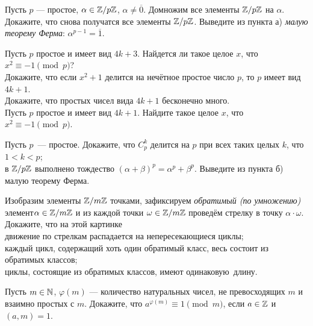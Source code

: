 \documentclass[a4paper, 12pt]{article}
\newcommand{\ov}{\overline}
\newcommand{\Zm}[1]{\Z/ {#1}\Z}
\begin{document}
Пусть $p$ --- простое, $\alpha\in\Zm{p}$, $\alpha\ne\ov{0}$.
Домножим все элементы $\Zm{p}$ на $\alpha$. Докажите, что снова получатся
все элементы $\Zm{p}$.
Выведите из пункта а) {\it малую теорему Ферма}: $\alpha^{p-1}=\ov{1}$.




Пусть $p$ простое и имеет вид $4k+3$. Найдется ли такое целое $x$, что $x^2\equiv-1\!\pmod{p}$?\\
Докажите, что если $x^2+1$ делится на неч\"етное простое число $p$,
то $p$ имеет вид $4k+1$.\\
Докажите, что простых чисел вида $4k+1$ бесконечно много.\\
Пусть $p$ простое и имеет вид $4k+1$. Найдите такое целое $x$, что $x^2\equiv-1\!\pmod{p}$.


 Пусть $p$~--- простое. Докажите, что
 $C_p^k$ делится на $p$ при всех таких целых $k$, что $1 < k < p$;\\
в $\Zm{p}$ выполнено тождество $(\alpha + \beta)^p = \alpha^p + \beta^p$.
 Выведите из пункта б) малую теорему Ферма.


Изобразим элементы $\Zm{m}$ точками, зафиксируем
{\it обратимый (по умножению)} элемент\break $\alpha\in\Zm{m}$ и из каждой точки
$\omega\in\Zm{m}$ провед\"ем стрелку в точку $\alpha\cdot \omega$.
Докажите, что на этой картинке \\
 движение по стрелкам распадается на непересекающиеся циклы;\\
 каждый цикл, содержащий хоть один обратимый класс, весь состоит из обратимых классов;\\
 циклы, состоящие из обратимых классов, имеют одинаковую~длину.



Пусть $m\in\mathbb{N}$,
$\varphi(m)$ --- количество натуральных чисел, не превосходящих $m$ и взаимно
простых с $m$.  Докажите, что $a^{\varphi(m)}\equiv1\!\pmod{m}$,
если $a\in\mathbb{Z}$ и $(a,m)=1$.
\end{document}
